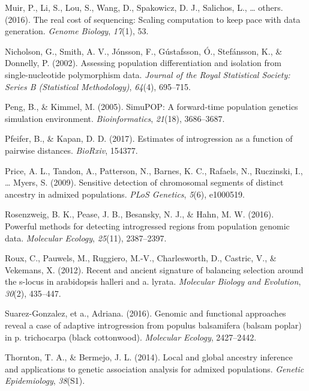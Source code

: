 \documentclass[12pt,twoside]{reedthesis}
\begin{document}
  \hypertarget{ref-muir2016real}{}
  Muir, P., Li, S., Lou, S., Wang, D., Spakowicz, D. J., Salichos, L.,
  \ldots{} others. (2016). The real cost of sequencing: Scaling
  computation to keep pace with data generation. \emph{Genome Biology},
  \emph{17}(1), 53.
  
  \hypertarget{ref-nicholson2002assessing}{}
  Nicholson, G., Smith, A. V., Jónsson, F., Gústafsson, Ó., Stefánsson,
  K., \& Donnelly, P. (2002). Assessing population differentiation and
  isolation from single-nucleotide polymorphism data. \emph{Journal of the
  Royal Statistical Society: Series B (Statistical Methodology)},
  \emph{64}(4), 695--715.
  
  \hypertarget{ref-peng2005simupop}{}
  Peng, B., \& Kimmel, M. (2005). SimuPOP: A forward-time population
  genetics simulation environment. \emph{Bioinformatics}, \emph{21}(18),
  3686--3687.
  
  \hypertarget{ref-pfeifer2017estimates}{}
  Pfeifer, B., \& Kapan, D. D. (2017). Estimates of introgression as a
  function of pairwise distances. \emph{BioRxiv}, 154377.
  
  \hypertarget{ref-price2009sensitive}{}
  Price, A. L., Tandon, A., Patterson, N., Barnes, K. C., Rafaels, N.,
  Ruczinski, I., \ldots{} Myers, S. (2009). Sensitive detection of
  chromosomal segments of distinct ancestry in admixed populations.
  \emph{PLoS Genetics}, \emph{5}(6), e1000519.
  
  \hypertarget{ref-rosenzweig2016powerful}{}
  Rosenzweig, B. K., Pease, J. B., Besansky, N. J., \& Hahn, M. W. (2016).
  Powerful methods for detecting introgressed regions from population
  genomic data. \emph{Molecular Ecology}, \emph{25}(11), 2387--2397.
  
  \hypertarget{ref-roux2012recent}{}
  Roux, C., Pauwels, M., Ruggiero, M.-V., Charlesworth, D., Castric, V.,
  \& Vekemans, X. (2012). Recent and ancient signature of balancing
  selection around the s-locus in arabidopsis halleri and a. lyrata.
  \emph{Molecular Biology and Evolution}, \emph{30}(2), 435--447.
  
  \hypertarget{ref-suarez2016}{}
  Suarez-Gonzalez, et a., Adriana. (2016). Genomic and functional
  approaches reveal a case of adaptive introgression from populus
  balsamifera (balsam poplar) in p. trichocarpa (black cottonwood).
  \emph{Molecular Ecology}, 2427--2442.
  
  \hypertarget{ref-thornton2014local}{}
  Thornton, T. A., \& Bermejo, J. L. (2014). Local and global ancestry
  inference and applications to genetic association analysis for admixed
  populations. \emph{Genetic Epidemiology}, \emph{38}(S1).
  
\end{document}
